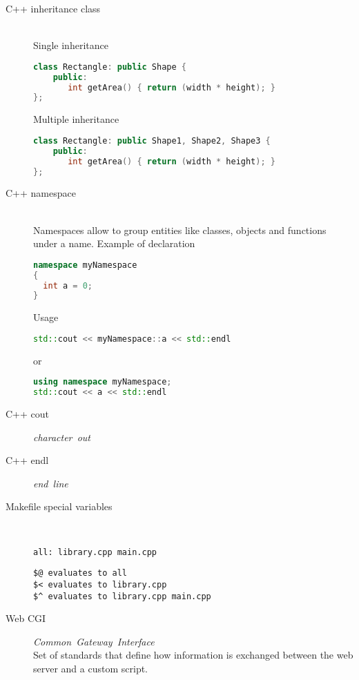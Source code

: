 \documentclass{article}
\begin{document}
\begin{description}
    \item[C++ inheritance class] \mbox{}\\ Single inheritance
\begin{lstlisting}[language=C++]
class Rectangle: public Shape {
    public:
       int getArea() { return (width * height); }
};
\end{lstlisting}
    Multiple inheritance
\begin{lstlisting}[language=C++]
class Rectangle: public Shape1, Shape2, Shape3 {
    public:
       int getArea() { return (width * height); }
};
\end{lstlisting}
    \item[C++ namespace] \mbox{}\\ Namespaces allow to group entities like classes, objects and functions under a name. Example of declaration
\begin{lstlisting}[language=C++]
namespace myNamespace
{
  int a = 0;
}
\end{lstlisting}

    Usage

\begin{lstlisting}[language=C++]
std::cout << myNamespace::a << std::endl
\end{lstlisting}
    or
\begin{lstlisting}[language=C++]
using namespace myNamespace;
std::cout << a << std::endl
\end{lstlisting}

    \item[C++ cout] \mbox{\textit{character out}}\\
    \item[C++ endl] \mbox{\textit{end line}}\\ 
    \item[Makefile special variables] \mbox{}\\
      
\begin{lstlisting}
all: library.cpp main.cpp
\end{lstlisting}

\begin{lstlisting}
$@ evaluates to all 
$< evaluates to library.cpp
$^ evaluates to library.cpp main.cpp
\end{lstlisting}

    \item[Web CGI] \mbox{\textit{Common Gateway Interface}}\\
    Set of standards that define how information is exchanged between the web server and a custom script.

\end{description}
\end{document}
